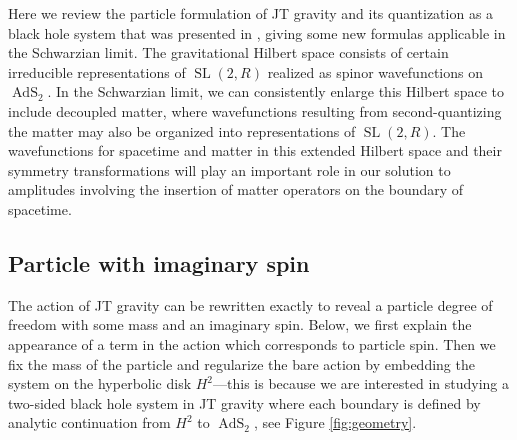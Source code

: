 \documentclass[12pt]{article}
\newcommand{\RR}{\mathbb{R}}
\DeclareMathOperator{\tSL}{\widetilde{\mathrm{SL}}}
\DeclareMathOperator{\tAdS}{\widetilde{AdS}}
\DeclareMathOperator{\HH}{H}
\def\widetilde#1{#1}%
\def\HH{H}
\def\RR{R}
\begin{document}
Here we review the particle formulation of JT gravity and its quantization as a black hole system that was presented in \cite{KiSuh18}, giving some new formulas applicable in the Schwarzian limit.
The gravitational Hilbert space consists of certain irreducible representations of $\tSL(2,\RR)$ realized as spinor wavefunctions on $\tAdS_2$. In the Schwarzian limit, we can consistently enlarge this Hilbert space to include decoupled matter, where wavefunctions resulting from second-quantizing the matter may also be organized into representations of $\tSL(2,\RR)$. The wavefunctions for spacetime and matter in this extended Hilbert space and their symmetry transformations will play an important role in our solution to amplitudes involving the insertion of matter operators on the boundary of spacetime.




\subsection{Particle with imaginary spin}




The action of JT gravity can be rewritten exactly to reveal a particle degree of freedom with some mass and an imaginary spin. Below, we first explain the appearance of a term in the action which corresponds to particle spin. Then we fix the mass of the particle and regularize the bare action by embedding the system on the hyperbolic disk $\HH^2$---this is because we are interested in studying a two-sided black hole system in JT gravity where each boundary is defined by analytic continuation from $\HH^2$ to $\tAdS_2$, see Figure \ref{fig:geometry}.
\end{document}
